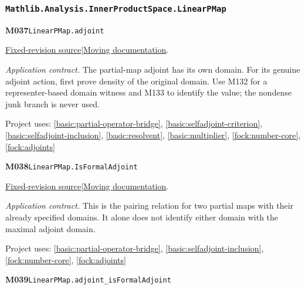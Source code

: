 \documentclass[11pt,a4paper]{article}
\theoremstyle{definition}
\theoremstyle{remark}
\begin{document}
\subsubsection*{\nolinkurl{Mathlib.Analysis.InnerProductSpace.LinearPMap}}
\noindent\textbf{M037}\label{base:M037}\quad\nolinkurl{LinearPMap.adjoint}

\href{https://github.com/leanprover-community/mathlib4/blob/9bac2d0692944a775113f7c130fd5e5b4608a854/Mathlib/Analysis/InnerProductSpace/LinearPMap.lean}{Fixed-revision source}\quad|\quad\href{https://leanprover-community.github.io/mathlib4_docs/Mathlib/Analysis/InnerProductSpace/LinearPMap.html#LinearPMap.adjoint}{Moving documentation}.\par
\noindent\textit{Application contract.} The partial-map adjoint has its own domain. For its genuine adjoint action, first prove density of the original domain. Use M132 for a representer-based domain witness and M133 to identify the value; the nondense junk branch is never used.\par
{\small Project uses: \ref{basic:partial-operator-bridge}, \ref{basic:selfadjoint-criterion}, \ref{basic:selfadjoint-inclusion}, \ref{basic:resolvent}, \ref{basic:multiplier}, \ref{fock:number-core}, \ref{fock:adjoints}}\par\medskip

\noindent\textbf{M038}\label{base:M038}\quad\nolinkurl{LinearPMap.IsFormalAdjoint}

\href{https://github.com/leanprover-community/mathlib4/blob/9bac2d0692944a775113f7c130fd5e5b4608a854/Mathlib/Analysis/InnerProductSpace/LinearPMap.lean}{Fixed-revision source}\quad|\quad\href{https://leanprover-community.github.io/mathlib4_docs/Mathlib/Analysis/InnerProductSpace/LinearPMap.html#LinearPMap.IsFormalAdjoint}{Moving documentation}.\par
\noindent\textit{Application contract.} This is the pairing relation for two partial maps with their already specified domains. It alone does not identify either domain with the maximal adjoint domain.\par
{\small Project uses: \ref{basic:partial-operator-bridge}, \ref{basic:selfadjoint-inclusion}, \ref{fock:number-core}, \ref{fock:adjoints}}\par\medskip

\noindent\textbf{M039}\label{base:M039}\quad\nolinkurl{LinearPMap.adjoint_isFormalAdjoint}
\end{document}
